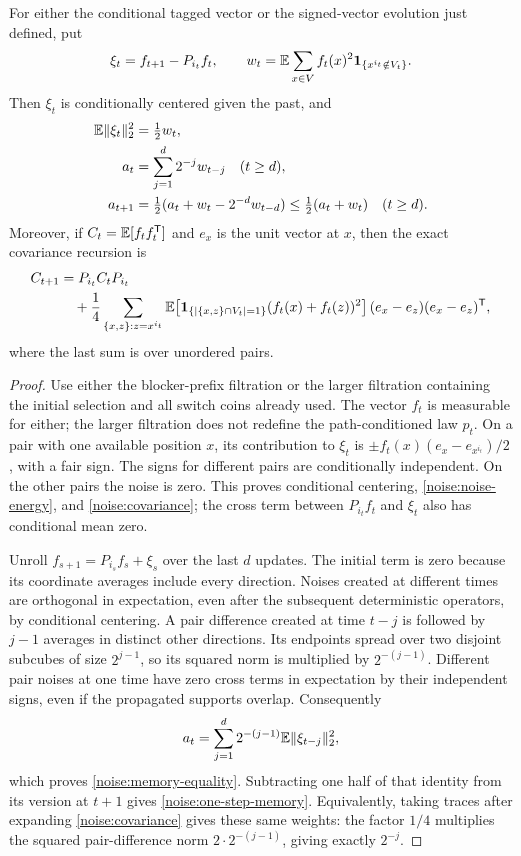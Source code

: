 \begin{lemma}
\label{noise:memory}
For either the conditional tagged vector or the signed-vector evolution
just defined, put
\[
 \xi_t=f_{t+1}-P_{i_t}f_t,
 \qquad
 w_t=\mathbb E\sum_{x\in V}f_t(x)^2\mathbf 1_{\{x^{i_t}\notin V_t\}}.
\]
Then $\xi_t$ is conditionally centered given the past, and
\begin{align}
 \mathbb E\|\xi_t\|_2^2&=\tfrac12w_t,\label{noise:noise-energy}\\
 a_t&=\sum_{j=1}^{d}2^{-j}w_{t-j}\quad(t\ge d),
 \label{noise:memory-equality}\\
 a_{t+1}&=\tfrac12(a_t+w_t-2^{-d}w_{t-d})
             \le\tfrac12(a_t+w_t)\quad(t\ge d).
 \label{noise:one-step-memory}
\end{align}
Moreover, if $C_t=\mathbb E[f_tf_t^{\mathsf T}]$ and $e_x$ is the unit vector
at $x$, then the exact covariance recursion is
\begin{align}
 C_{t+1}&=P_{i_t}C_tP_{i_t}\notag\\
 &\quad+\frac14\sum_{\{x,z\}:z=x^{i_t}}
  \mathbb E\!\left[\mathbf 1_{\{|\{x,z\}\cap V_t|=1\}}
                     (f_t(x)+f_t(z))^2\right]
     (e_x-e_z)(e_x-e_z)^{\mathsf T},
 \label{noise:covariance}
\end{align}
where the last sum is over unordered pairs.
\end{lemma}

\begin{proof}
Use either the blocker-prefix filtration or the larger filtration
containing the initial selection and all switch coins already used.
The vector $f_t$ is measurable for either; the larger filtration does not
redefine the path-conditioned law $p_t$. On a pair with one available position $x$,
its contribution to $\xi_t$ is
$\pm f_t(x)(e_x-e_{x^{i_t}})/2$, with a fair sign. The signs for
different pairs are conditionally independent. On the other pairs the
noise is zero. This proves conditional centering,
\eqref{noise:noise-energy}, and \eqref{noise:covariance}; the cross term
between $P_{i_t}f_t$ and $\xi_t$ also has conditional mean zero.

Unroll $f_{s+1}=P_{i_s}f_s+\xi_s$ over the last $d$ updates. The initial
term is zero because its coordinate averages include every direction.
Noises created at different times are orthogonal in expectation, even
after the subsequent deterministic operators, by conditional centering.
A pair difference created at time $t-j$ is followed by $j-1$ averages
in distinct other directions. Its endpoints spread over two disjoint
subcubes of size $2^{j-1}$, so its squared norm is multiplied by
$2^{-(j-1)}$. Different pair noises at one time have zero cross terms
in expectation by their independent signs, even if the propagated
supports overlap. Consequently
\[
 a_t=\sum_{j=1}^d2^{-(j-1)}\mathbb E\|\xi_{t-j}\|_2^2,
\]
which proves \eqref{noise:memory-equality}. Subtracting one half of that
identity from its version at $t+1$ gives
\eqref{noise:one-step-memory}. Equivalently, taking traces after
expanding \eqref{noise:covariance} gives these same weights: the factor
$1/4$ multiplies the squared pair-difference norm
$2\cdot2^{-(j-1)}$, giving exactly $2^{-j}$.
\end{proof}

